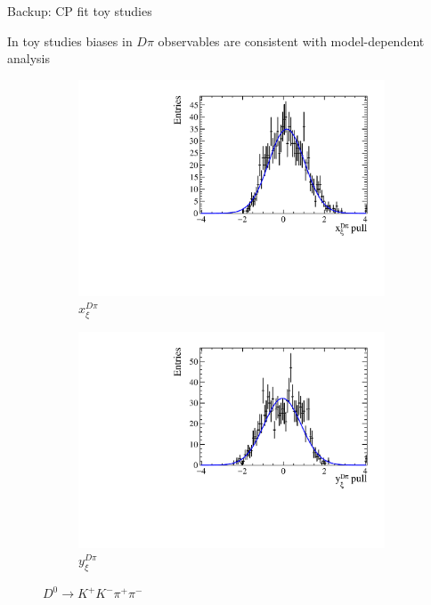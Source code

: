 \documentclass[xcolor={dvipsnames}]{beamer}
\begin{document}
\begin{frame}{Backup: CP fit toy studies}
  \begin{center}
    In toy studies biases in $D\pi$ observables are consistent with model-dependent analysis
  \end{center}
  \begin{figure}
    \centering
    \begin{subfigure}{0.5\textwidth}
      \centering
      \includegraphics[width=1.0\textwidth]{Plots/A_Re_xi_dpi_pull.pdf}
      \vspace{-0.3cm}
      \caption*{$x_\xi^{D\pi}$}
    \end{subfigure}%
    \begin{subfigure}{0.5\textwidth}
      \centering
      \includegraphics[width=1.0\textwidth]{Plots/A_Im_xi_dpi_pull.pdf}
      \vspace{-0.3cm}
      \caption*{$y_\xi^{D\pi}$}
    \end{subfigure}
    \caption*{$D^0\to K^+K^-\pi^+\pi^-$}
  \end{figure}
\end{frame}
\end{document}
